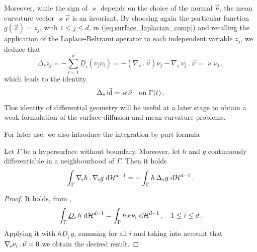 Moreover, while the sign of $\varkappa$ depends on the choice of the normal
$\vec\nu$, the mean curvature vector $\varkappa \vec\nu$ is an invariant. By
choosing again the particular function $g(\vec z) = z_j$, with $1 \leq j \leq
d$, in (\ref{eq:surface_laplacian_comp}) and recalling the application of the
Laplace-Beltrami operator to each independent variable $z_j$, we deduce that
\begin{equation}
\Delta_s z_j = - \sum_{i = 1}^d \underline{D}_i (\nu_j \nu_i) =
- (\nabla_s \,.\, \vec\nu) \nu_j - \nabla_s \, \nu_j \,.\, \vec\nu = \varkappa
\nu_j\, ,
\end{equation}
which leads to the identity
\begin{equation} \label{eq:LBop}
\Delta_s\, \vec {\rm id} = \varkappa\, \vec\nu \quad \mbox{on $\Gamma(t)$}\,.
\end{equation}
This identity of differential geometry will be useful at a later stage to
obtain a weak formulation of the surface diffusion and mean curvature problems.

For later use, we also introduce the integration by part formula
\begin{lemma}
Let $\Gamma$ be a hypersurface without boundary. Moreover, let $h$ and $g$
continuously differentiable in a neighbourhood of $\Gamma$. Then it holds
\begin{equation}\label{eq:integration_by_part}
\int_\Gamma \nabla_{\!s} h\,.\,\nabla_{\!s} g \;{\rm d}{\cal H}^{d-1} =-\int_\Gamma h\,\Delta_s g\;{\rm d}{\cal H}^{d-1}\,.
\end{equation}
\end{lemma}

\begin{proof}
It holds, from \cite{GilbargT83},
\begin{equation*}
\int_\Gamma \underline{D}_i\,h \;{\rm d}{\cal H}^{d-1} = \int_\Gamma h\varkappa\nu_i\;{\rm d}{\cal H}^{d-1}\,,
\quad 1 \leq i \leq d\,.
\end{equation*}
Applying it with $h\underline{D}_i\,g$, summing for all $i$ and taking into
account that $\nabla_{\!s}\nu_i\,.\,\vec \nu=0$ we obtain the desired result.
\end{proof}

